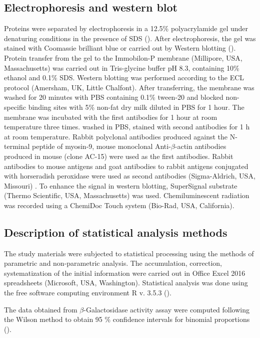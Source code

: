 \documentclass[alpha-refs]{wiley-article}
\begin{document}
\subsection{Electrophoresis and western blot}

Proteins were separated by electrophoresis in a 12.5\%  polyacrylamide gel under denaturing conditions in the presence of SDS (\cite{laemmli1970cleavage}).
After electrophoresis, the gel was stained with Coomassie brilliant blue or carried out by Western blotting (\cite{towbin1979electrophoretic}).
Protein transfer from the gel to the Immobilon-P membrane (Millipore, USA, Massachusetts) was carried out in Tris-glycine buffer pH 8.3, containing 10\% ethanol and 0.1\% SDS.
Western blotting was performed according to the ECL protocol (Amersham, UK, Little Chalfont).
After transferring, the membrane was washed for 20 minutes with PBS containing 0.1\% tween-20 and blocked non-specific binding sites with 5\% non-fat dry milk diluted in PBS for 1 hour.
The membrane was incubated with the first antibodies for 1 hour at room temperature three times. washed in PBS, stained with second antibodies for 1 h at room temperature.
Rabbit polyclonal antibodies produced against the N-terminal peptide of myosin-9, mouse monoclonal Anti-$\beta$-actin antibodies produced in mouse (clone AC-15) were used as the first antibodies.
Rabbit antibodies to mouse antigens and goat antibodies to rabbit antigens conjugated with horseradish peroxidase were used as second antibodies (Sigma-Aldrich, USA, Missouri) .
To enhance the signal in western blotting, SuperSignal substrate (Thermo Scientific, USA, Massachusetts) was used.
Chemiluminescent radiation was recorded using a ChemiDoc Touch system (Bio-Rad, USA, California).

\subsection{Description of statistical analysis methods}

The study materials were subjected to statistical processing using the methods of parametric and non-parametric analysis.
The accumulation, correction, systematization of the initial information were carried out in Office Excel 2016 spreadsheets (Microsoft, USA, Washington).
Statistical analysis was done using the free software computing environment R v. 3.5.3 (\cite{team2014r}).

The data obtained from $\beta$-Galactosidase activity assay were computed following the Wilson method to obtain 95 \% confidence intervals for binomial proportions (\cite{wilson1927probable}).
\end{document}
